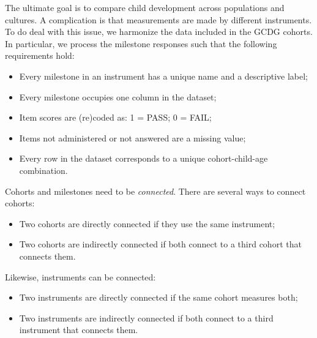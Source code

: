 \documentclass[
]{book}
\providecommand{\tightlist}{%
  \setlength{\itemsep}{0pt}\setlength{\parskip}{0pt}}
\begin{document}
The ultimate goal is to compare child development across populations and cultures. A complication is that measurements are made by different instruments. To do deal with this issue, we harmonize the data included in the GCDG cohorts. In particular, we process the milestone responses such that the following requirements hold:

\begin{itemize}
\tightlist
\item
  Every milestone in an instrument has a unique name and a descriptive label;
\item
  Every milestone occupies one column in the dataset;
\item
  Item scores are (re)coded as: 1 = PASS; 0 = FAIL;
\item
  Items not administered or not answered are a missing value;
\item
  Every row in the dataset corresponds to a unique cohort-child-age combination.
\end{itemize}

Cohorts and milestones need to be \emph{connected}. There are several ways to connect cohorts:

\begin{itemize}
\tightlist
\item
  Two cohorts are directly connected if they use the same instrument;
\item
  Two cohorts are indirectly connected if both connect to a third cohort that connects them.
\end{itemize}

Likewise, instruments can be connected:

\begin{itemize}
\tightlist
\item
  Two instruments are directly connected if the same cohort measures both;
\item
  Two instruments are indirectly connected if both connect to a third instrument that connects them.
\end{itemize}

\providecommand{\docline}[3]{\noalign{\global\setlength{\arrayrulewidth}{#1}}\arrayrulecolor[HTML]{#2}\cline{#3}}

\setlength{\tabcolsep}{2pt}

\renewcommand*{\arraystretch}{1.5}
\end{document}
